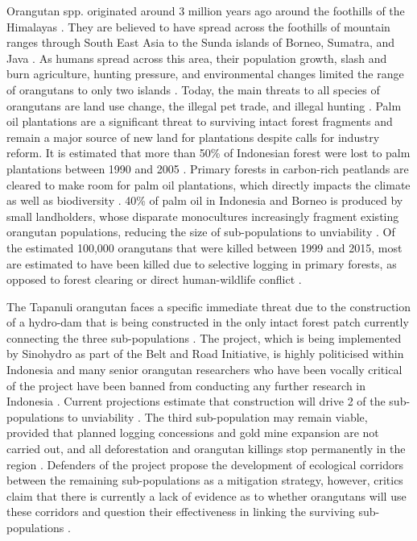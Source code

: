 Orangutan spp. originated around 3 million years ago around the foothills of the Himalayas \citep{Rijksen.1999}. They are believed to have spread across the foothills of mountain ranges through South East Asia to the Sunda islands of Borneo, Sumatra, and Java \citep{Meijaard.2022}. As humans spread across this area, their population growth, slash and burn agriculture, hunting pressure, and environmental changes limited the range of orangutans to only two islands \citep{Rijksen.1999}. Today, the main threats to all species of orangutans are land use change, the illegal pet trade, and illegal hunting \citep{Rijksen.1999}. Palm oil plantations are a significant threat to surviving intact forest fragments and remain a major source of new land for plantations despite calls for industry reform. It is estimated that more than 50\% of Indonesian forest were lost to palm plantations between 1990 and 2005 \citep{Gibbs.2010}. Primary forests in carbon-rich peatlands are cleared to make room for palm oil plantations, which directly impacts the climate as well as biodiversity \citep{Gaveau.2009}. 40\% of palm oil in Indonesia and Borneo is produced by small landholders, whose disparate monocultures increasingly fragment existing orangutan populations, reducing the size of sub-populations to unviability \citep{Wich.2008v8i0d}. Of the estimated 100,000 orangutans that were killed between 1999 and 2015, most are estimated to have been killed due to selective logging in primary forests, as opposed to forest clearing or direct human-wildlife conflict \citep{Voigt.2018}. 

The Tapanuli orangutan faces a specific immediate threat due to the construction of a hydro-dam that is being constructed in the only intact forest patch currently connecting the three sub-populations \citep{Nater.2017,Laurance.2020}. The project, which is being implemented by Sinohydro as part of the Belt and Road Initiative, is highly politicised within Indonesia and many senior orangutan researchers who have been vocally critical of the project have been banned from conducting any further research in Indonesia \citep{Pramono.2022,CNN.2022}. Current projections estimate that construction will drive 2 of the sub-populations to unviability \citep{Wich.2019}. The third sub-population may remain viable, provided that planned logging concessions and gold mine expansion are not carried out, and all deforestation and orangutan killings stop permanently in the region \citep{Laurance.2020}. Defenders of the project propose the development of ecological corridors between the remaining sub-populations as a mitigation strategy, however, critics claim that there is currently a lack of evidence as to whether orangutans will use these corridors and question their effectiveness in linking the surviving sub-populations \citep{Kuswanda.2022}.

